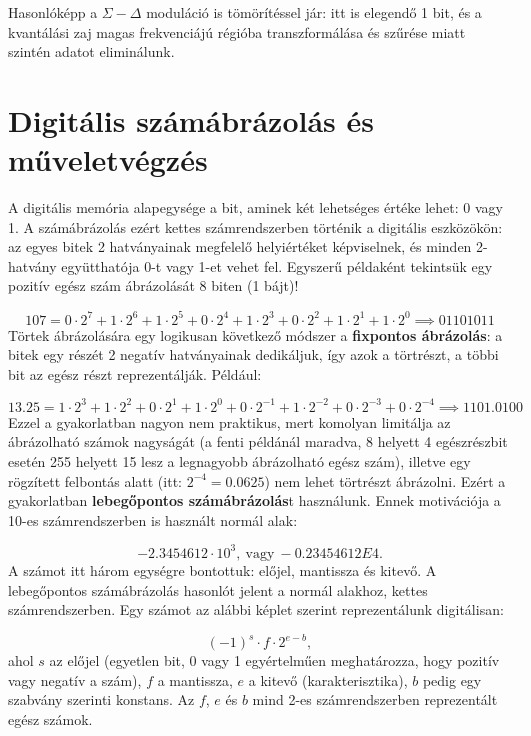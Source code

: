 \documentclass[12pt]{article}
\theoremstyle{plain}
\begin{document}
Hasonlóképp a $\Sigma-\Delta$ moduláció is tömörítéssel jár: itt is elegendő 1 bit, és a kvantálási zaj magas frekvenciájú régióba transzformálása és szűrése miatt szintén adatot eliminálunk.


\section{Digitális számábrázolás és műveletvégzés}

A digitális memória alapegysége a bit, aminek két lehetséges értéke lehet: 0 vagy 1. A számábrázolás ezért kettes számrendszerben történik a digitális eszközökön: az egyes bitek 2 hatványainak megfelelő helyiértéket képviselnek, és minden 2-hatvány együtthatója 0-t vagy 1-et vehet fel. Egyszerű példaként tekintsük egy pozitív egész szám ábrázolását 8 biten (1 bájt)!

\begin{equation}
	107 = 0 \cdot 2^7 + 1 \cdot 2^6 + 1 \cdot 2^5 + 0 \cdot 2^4 + 1 \cdot 2^3 + 0 \cdot 2^2 + 1 \cdot 2^1 + 1 \cdot 2^0 \implies 01101011
\end{equation}
Törtek ábrázolására egy logikusan következő módszer a \textbf{fixpontos ábrázolás}: a bitek egy részét 2 negatív hatványainak dedikáljuk, így azok a törtrészt, a többi bit az egész részt reprezentálják. Például:

\begin{equation}
	13.25 = 1 \cdot 2^3 + 1 \cdot 2^2 + 0 \cdot 2^1 + 1 \cdot 2^0 +
	 0 \cdot 2^{-1} + 1 \cdot 2^{-2} + 0 \cdot 2^{-3} + 0 \cdot 2^{-4} 
	 \implies 1101.0100
\end{equation}
Ezzel a gyakorlatban nagyon nem praktikus, mert komolyan limitálja az ábrázolható számok nagyságát (a fenti példánál maradva, 8 helyett 4 egészrészbit esetén 255 helyett 15 lesz a legnagyobb ábrázolható egész szám), illetve egy rögzített felbontás alatt (itt: $2^{-4} = 0.0625$) nem lehet törtrészt ábrázolni. Ezért a gyakorlatban \textbf{lebegőpontos számábrázolás}t használunk. Ennek motivációja a 10-es számrendszerben is használt normál alak:

\begin{equation}
	-2.3454612 \cdot 10^3, ~\mathrm{vagy} ~ -0.23454612E4.
\end{equation}
A számot itt három egységre bontottuk: előjel, mantissza és kitevő. A lebegőpontos számábrázolás hasonlót jelent a normál alakhoz, kettes számrendszerben. Egy számot az alábbi képlet szerint reprezentálunk digitálisan:

\begin{equation}
	(-1)^s \cdot f \cdot 2^{e-b},
\end{equation}
ahol $s$ az előjel (egyetlen bit, 0 vagy 1 egyértelműen meghatározza, hogy pozitív vagy negatív a szám), $f$ a mantissza, $e$ a kitevő (karakterisztika), $b$ pedig egy szabvány szerinti konstans. Az $f$, $e$ és $b$ mind 2-es számrendszerben reprezentált egész számok.
\end{document}
